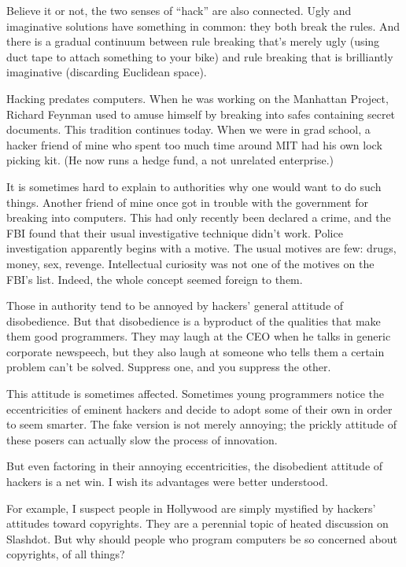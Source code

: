 \documentclass[12pt]{book}
\begin{document}
Believe it or not, the two senses of ``hack'' are also connected. Ugly
and imaginative solutions have something in common: they both break the
rules. And there is a gradual continuum between rule breaking that's
merely ugly (using duct tape to attach something to your bike) and rule
breaking that is brilliantly imaginative (discarding Euclidean space).

Hacking predates computers. When he was working on the Manhattan
Project, Richard Feynman used to amuse himself by breaking into safes
containing secret documents. This tradition continues today. When we
were in grad school, a hacker friend of mine who spent too much time
around MIT had his own lock picking kit. (He now runs a hedge fund, a
not unrelated enterprise.)

It is sometimes hard to explain to authorities why one would want to do
such things. Another friend of mine once got in trouble with the
government for breaking into computers. This had only recently been
declared a crime, and the FBI found that their usual investigative
technique didn't work. Police investigation apparently begins with a
motive. The usual motives are few: drugs, money, sex, revenge.
Intellectual curiosity was not one of the motives on the FBI's list.
Indeed, the whole concept seemed foreign to them.

Those in authority tend to be annoyed by hackers' general attitude of
disobedience. But that disobedience is a byproduct of the qualities that
make them good programmers. They may laugh at the CEO when he talks in
generic corporate newspeech, but they also laugh at someone who tells
them a certain problem can't be solved. Suppress one, and you suppress
the other.

This attitude is sometimes affected. Sometimes young programmers notice
the eccentricities of eminent hackers and decide to adopt some of their
own in order to seem smarter. The fake version is not merely annoying;
the prickly attitude of these posers can actually slow the process of
innovation.

But even factoring in their annoying eccentricities, the disobedient
attitude of hackers is a net win. I wish its advantages were better
understood.

For example, I suspect people in Hollywood are simply mystified by
hackers' attitudes toward copyrights. They are a perennial topic of
heated discussion on Slashdot. But why should people who program
computers be so concerned about copyrights, of all things?
\end{document}
